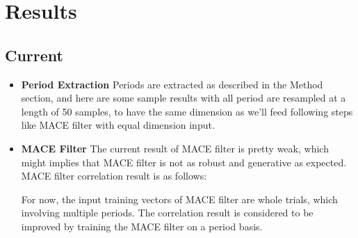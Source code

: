 \documentclass[10pt,twocolumn,letterpaper]{article}
\begin{document}
\section{Results}
\subsection{Current}
    \begin{itemize}
    \item \textbf{Period Extraction}\newline
    Periods are extracted as described in the Method section, and here are some sample results with all period are resampled at a length of 50 samples, to have the same dimension as we’ll feed following steps like MACE filter with equal dimension input.

\begin{figure}[t]
\begin{center}
\fbox{\rule{0pt}{2in} \rule{0.9\linewidth}{0pt}}
   \caption{}
\end{center}
\end{figure}

\begin{figure}[t]
\begin{center}
\fbox{\rule{0pt}{2in} \rule{0.9\linewidth}{0pt}}
   \caption{}
\end{center}
\end{figure}
\item \textbf{MACE Filter}\newline
The current result of MACE filter is pretty weak, which might implies that MACE filter is not as robust and generative as expected. MACE filter correlation result is as follows:

\begin{figure}[t]
\begin{center}
\fbox{\rule{0pt}{2in} \rule{0.9\linewidth}{0pt}}
   \caption{}
\end{center}
\end{figure}

For now, the input training vectors of MACE filter are whole trials, which involving multiple periods. The correlation result is considered to be improved by training the MACE filter on a period basis.
    \end{itemize}
\end{document}
